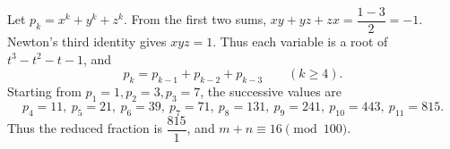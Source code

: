 Let $p_k=x^k+y^k+z^k$. From the first two sums, $xy+yz+zx=\dfrac{1-3}{2}=-1$. Newton's third identity gives $xyz=1$. Thus each variable is a root of $t^3-t^2-t-1$, and
\[
p_k=p_{k-1}+p_{k-2}+p_{k-3}\qquad(k\ge4).
\]
Starting from $p_1=1,p_2=3,p_3=7$, the successive values are
\[
p_4=11,\ p_5=21,\ p_6=39,\ p_7=71,\ p_8=131,\ p_9=241,\ p_{10}=443,\ p_{11}=815.
\]
Thus the reduced fraction is $\dfrac{815}{1}$, and $\boxed{m+n\equiv16\pmod{100}}$.
